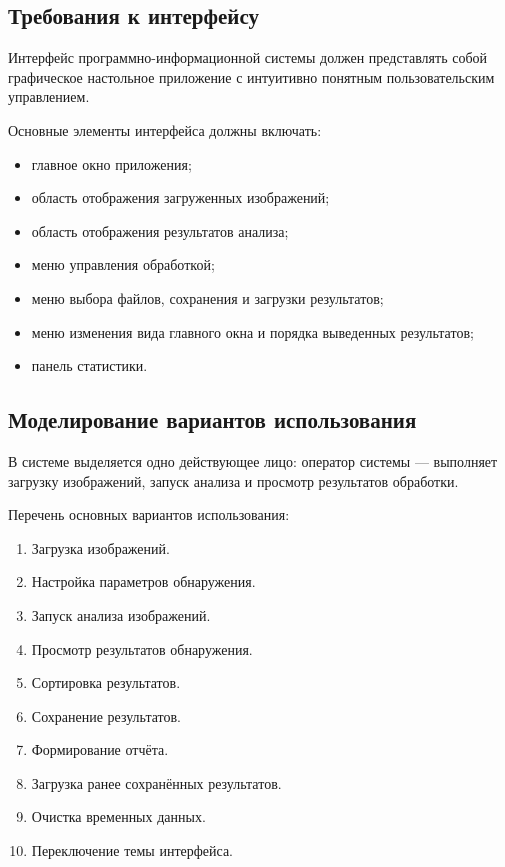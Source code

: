 \subsection{Требования к интерфейсу}

Интерфейс программно-информационной системы должен представлять собой графическое настольное приложение с интуитивно понятным пользовательским управлением.

Основные элементы интерфейса должны включать:

\begin{itemize}
	\item главное окно приложения;
	\item область отображения загруженных изображений;
	\item область отображения результатов анализа;
	\item меню управления обработкой;
	\item меню выбора файлов, сохранения и загрузки результатов;
	\item меню изменения вида главного окна и порядка выведенных результатов;
	\item панель статистики.
\end{itemize}

\subsection{Моделирование вариантов использования}

В системе выделяется одно действующее лицо: оператор системы --- выполняет загрузку изображений, запуск анализа и просмотр результатов обработки.

Перечень основных вариантов использования:

\begin{enumerate}
	\item Загрузка изображений.
	\item Настройка параметров обнаружения.
	\item Запуск анализа изображений.
	\item Просмотр результатов обнаружения.
	\item Сортировка результатов.
	\item Сохранение результатов.
	\item Формирование отчёта.
	\item Загрузка ранее сохранённых результатов.
	\item Очистка временных данных.
	\item Переключение темы интерфейса.
\end{enumerate}

